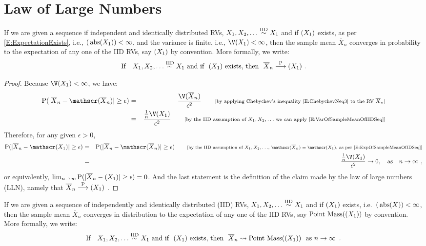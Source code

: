\section{Law of Large Numbers}

\begin{prop}
If we are given a sequence if independent and identically distributed RVs, $X_1,X_2,\ldots \overset{{\rm IID}}{\sim} X_1$ and if $\mathscr{(}X_1)$ exists, as per \eqref{E:ExpectationExists}, i.e., $\mathscr{(}\operatorname{abs}(X_1))< \infty$, and the variance is finite, i.e., $\V(X_1) < \infty$, then the sample mean $\overline{X}_n$ converges in probability to the expectation of any one of the IID RVs, say $\mathscr{(}X_1)$ by convention.  More formally, we write:
\[
\text{If} \quad X_1,X_2,\ldots \overset{\IID}{\sim} X_1 \ \text{and if } \ \E(X_1) \ \text{exists, then } \ \overline{X}_n \overset{\P}{\longrightarrow} \E(X_1) \ .
\]
{\normalsize
\begin{proof}
Because $\V(X_1) < \infty$, we have:
\begin{eqnarray}
\P(| \overline{X}_n - \E(\overline{X}_n) | \geq \epsilon)
&=& \frac{\V(\overline{X}_n)}{\epsilon^2} \qquad \text{{\scriptsize [by applying Chebychev's inequality \eqref{E:ChebychevNeq3} to the RV $\overline{X}_n$]}} \notag \\
&=& \frac{\frac{1}{n}\V(X_1)}{\epsilon^2} \qquad \text{{\scriptsize [by the IID assumption of $X_1,X_2,\ldots$ we can apply \eqref{E:VarOfSampleMeanOfIIDSeq}]}} \notag 
\end{eqnarray}
Therefore, for any given $\epsilon>0$,
\begin{eqnarray}
\P(| \overline{X}_n - \E(X_1) | \geq \epsilon)
&=&  \P(| \overline{X}_n - \E(\overline{X}_n) | \geq \epsilon) \qquad \text{{\scriptsize [by the IID assumption of $X_1,X_2,\ldots$,  $\E(\overline{X}_n)=\E(X_1)$, as per \eqref{E:ExpOfSampleMeanOfIDSeq}]}} \notag \\
&=&  \frac{\frac{1}{n}\V(X_1)}{\epsilon^2} \to 0, \quad \text{as} \quad n \to \infty \ , \notag
\end{eqnarray}
or equivalently, $\lim_{n \to \infty} \operatorname{{P}}(| \overline{X}_n - \mathscr{(}X_1) | \geq \epsilon) = 0$.  And the last statement is the definition of the claim made by the law of large numbers (LLN), namely that $\overline{X}_n \overset{\operatorname{{P}}}{\longrightarrow} \mathscr{(}X_1)$ .
\end{proof}
}

\begin{prop}
If we are given a sequence of independently and identically distributed (IID) RVs, $X_1,X_2,\ldots \overset{{\rm IID}}{\sim} X_1$ and if $\mathscr{(}X_1)$ exists, i.e.~$\mathscr{(}\operatorname{abs}(X)) < \infty$, then the sample mean $\overline{X}_n$ converges in distribution to the expectation of any one of the IID RVs, say $\mbox{{\rm Point~Mass}}(\mathscr{(}X_1))$ by convention.  More formally, we write:
\[
\text{If} \quad X_1,X_2,\ldots \overset{{\rm IID}}{\sim} X_1 \ \text{and if } \ \mathscr{(}X_1) \ \text{exists, then } \ \overline{X}_n \rightsquigarrow \mbox{{\rm Point~Mass}}(\mathscr{(}X_1)) \ \text{ as } n\to\infty \enspace .
\]
\end{prop}


\end{prop}

